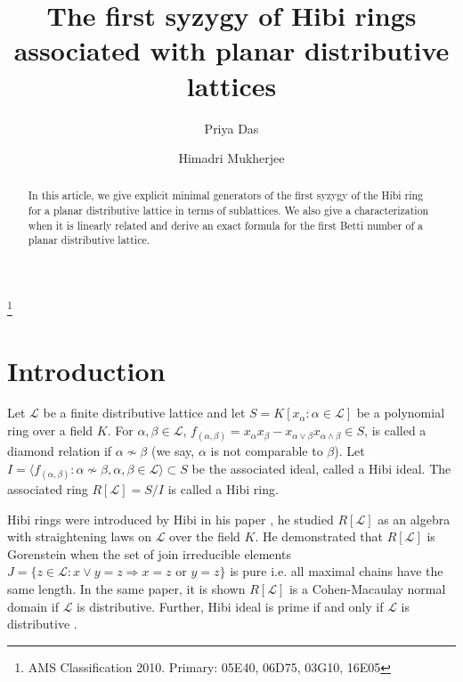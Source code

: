 \documentclass[10pt,reqno]{amsart}
\numberwithin{equation}{section}
\begin{document}
\title{The first syzygy of Hibi rings associated with planar distributive lattices}


\author[P. Das]{Priya Das}
\address{Indian Institute of science education and research kolkata, West
Bengal, India}
\author[H.~Mukherjee]{Himadri Mukherjee}
\address{BITS Pilani K.K. Birla Goa campus, India}

\thanks{AMS Classification 2010. Primary: 05E40, 06D75, 03G10, 16E05}
\maketitle
\begin{abstract}
  In this article, we give explicit minimal generators of
the first syzygy of the Hibi ring for a planar distributive lattice in terms of sublattices. We also give a characterization when it is linearly related and derive an exact formula for the first Betti number of a planar distributive lattice.
\end{abstract}

\section{Introduction}
Let $\mathcal{L}$ be a finite distributive lattice and let $S=K[x_{\alpha}: \alpha \in \mathcal{L}]$ be a polynomial ring over a field 
$K$. For $\alpha,\beta \in \mathcal{L}$,
$f_{(\alpha,\beta)}=x_{\alpha}x_{\beta}- x_{\alpha \vee \beta}x_{\alpha \wedge \beta} \in S$, is called a diamond relation
if $\alpha \nsim \beta$ (we say, $\alpha$ is not comparable to $\beta$). Let $I=\langle f_{(\alpha,\beta)}: \alpha \nsim \beta, \alpha,\beta \in \mathcal{L}\rangle \subset S$ be the associated ideal, called a Hibi ideal. The associated ring $R[\mathcal{L}]=S/I$ is called a Hibi ring. 

Hibi rings were introduced by Hibi in his paper \cite{hibi00}, he studied $R[\mathcal{L}]$
as an algebra with straightening laws on $\mathcal{L}$ over the field $K$. He demonstrated that $R[\mathcal{L}]$ is Gorenstein when the set of join irreducible elements
$J=\{ z \in \mathcal{L}: x \vee y=z \Rightarrow x=z$ or $y=z \}$ is pure i.e. all maximal chains have the same length. In the same paper, it is shown $R[\mathcal{L}]$ is a Cohen-Macaulay normal domain if $\mathcal{L}$ is distributive. Further, Hibi ideal is prime if and only if $\mathcal{L}$ is distributive \cite{hibi00}.
\end{document}

